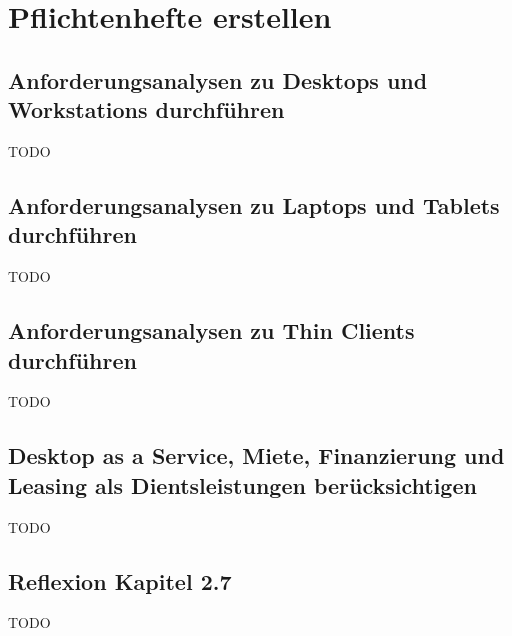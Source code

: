 \section{Pflichtenhefte erstellen}
\subsection{Anforderungsanalysen zu Desktops und Workstations durchführen}
    TODO
\subsection{Anforderungsanalysen zu Laptops und Tablets durchführen}
    TODO
\subsection{Anforderungsanalysen zu Thin Clients durchführen}
    TODO
\subsection{Desktop as a Service, Miete, Finanzierung und Leasing als Dientsleistungen berücksichtigen}
    TODO
\subsection*{Reflexion Kapitel 2.7}
    \begin{refindent}
        TODO
    \end{refindent}